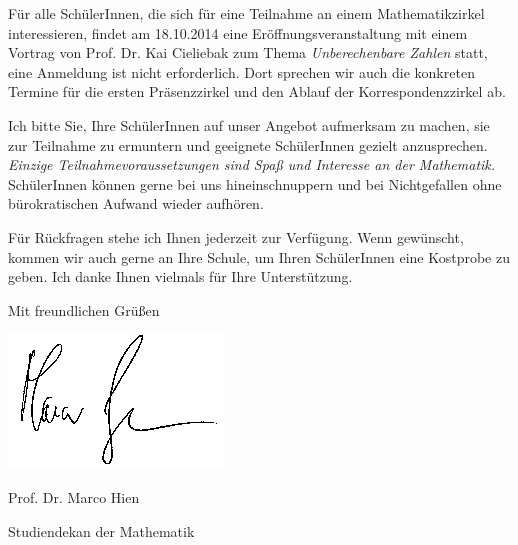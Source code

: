 \documentclass{serienbrief}
\newif\ifmore \moretrue
\begin{document}
{Für alle SchülerInnen, die sich für eine Teilnahme an einem Mathematikzirkel
interessieren, findet am 18.10.2014 eine Eröffnungsveranstaltung mit einem Vortrag von
Prof. Dr. Kai Cieliebak zum Thema \emph{Unberechenbare Zahlen}
statt, eine
Anmeldung ist nicht erforderlich. Dort sprechen wir auch die konkreten Termine für die
ersten Präsenzzirkel und den Ablauf der Korrespondenzzirkel ab.

Ich bitte Sie, Ihre SchülerInnen auf unser Angebot aufmerksam zu machen, sie zur
Teilnahme zu ermuntern und geeignete SchülerInnen gezielt
anzusprechen. \emph{Einzige Teilnahmevoraussetzungen sind Spaß und
Interesse an der Mathematik.} SchülerInnen können gerne bei uns
hineinschnuppern und bei Nichtgefallen ohne bürokratischen Aufwand wieder
aufhören.

Für Rückfragen stehe ich Ihnen jederzeit zur Verfügung. Wenn gewünscht, kommen wir auch
gerne an Ihre Schule, um Ihren SchülerInnen eine Kostprobe zu geben. Ich danke
Ihnen vielmals für Ihre Unterstützung.

Mit freundlichen Gr\"u\ss en
\vspace{0.0cm}

\hspace{1cm} \includegraphics[scale=0.4]{unterschrift_marco_hien}

\vspace{-0.4cm}

Prof. Dr. Marco Hien

\vspace{-0.2cm}

{\small Studiendekan der Mathematik}

\newpage}

 \fi
 \ifmore\repeat
 
 \closein\quelle
\end{document}
